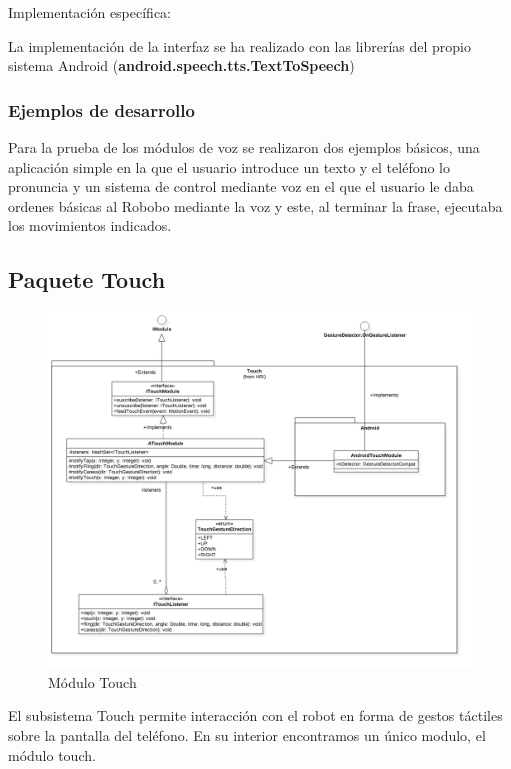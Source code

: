 


Implementación específica:

La implementación de la interfaz se ha realizado con las librerías del propio sistema Android (\textbf{android.speech.tts.TextToSpeech})

\subsubsection*{Ejemplos de desarrollo}

Para la prueba de los módulos de voz se realizaron dos ejemplos básicos, una aplicación simple en la que el usuario introduce un texto y el teléfono lo pronuncia y un sistema de control mediante voz en el que el usuario le daba ordenes básicas al Robobo mediante la voz y este, al terminar la frase, ejecutaba los movimientos indicados.
\newpage
\subsection{Paquete Touch}


\begin{figure}
	\centering
	\includegraphics[width=1\linewidth]{imagenes/diagramas/TouchModule.png}
	\caption{Módulo Touch}
	\label{fig:touch-module}
\end{figure}


El subsistema Touch permite interacción con el robot en forma de gestos táctiles sobre la pantalla del teléfono. En su interior encontramos un único modulo, el módulo touch.
